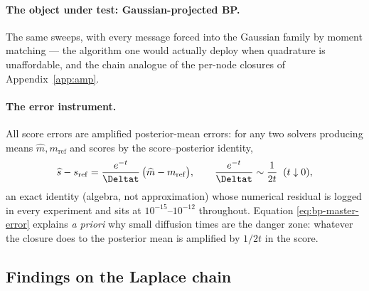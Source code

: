 \paragraph{The object under test: Gaussian-projected BP.} The same
sweeps, with every message forced into the Gaussian family by moment
matching --- the algorithm one would actually deploy when quadrature is
unaffordable, and the chain analogue of the per-node closures of
Appendix~\ref{app:amp}.

\paragraph{The error instrument.} All score errors are amplified
posterior-mean errors: for any two solvers producing means
$\widehat m, m_{\mathrm{ref}}$ and scores by the score--posterior
identity,
\begin{equation}
  \widehat s - s_{\mathrm{ref}}
  = \frac{e^{-t}}{\Deltat}\,
    \big( \widehat m - m_{\mathrm{ref}} \big),
  \qquad
  \frac{e^{-t}}{\Deltat} \sim \frac{1}{2t} \;\; (t \downarrow 0),
  \label{eq:bp-master-error}
\end{equation}
an exact identity (algebra, not approximation) whose numerical residual is
logged in every experiment and sits at $10^{-15}$--$10^{-12}$ throughout.
Equation \eqref{eq:bp-master-error} explains \emph{a priori} why small
diffusion times are the danger zone: whatever the closure does to the
posterior mean is amplified by $1/2t$ in the score.

\subsection{Findings on the Laplace chain}

